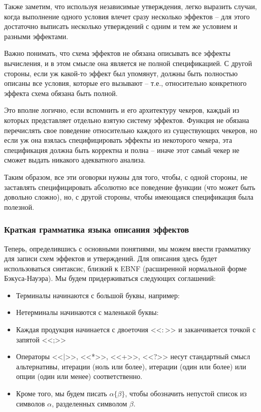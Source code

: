 Также заметим, что используя независимые утверждения, легко выразить случаи, когда выполнение одного условия влечет сразу несколько эффектов -- для этого достаточно выписать несколько утверждений с одним и тем же условием и разными эффектами.

Важно понимать, что схема эффектов не обязана описывать все эффекты вычисления, и в этом смысле она является не полной спецификацией. С другой стороны, если уж какой-то эффект был упомянут, должны быть полностью описаны все условия, которые его вызывают -- т.е., относительно конкретного эффекта схема обязана быть полной.

Это вполне логично, если вспомнить  и его архитектуру чекеров, каждый из которых представляет отдельно взятую систему эффектов. Функция не обязана перечислять свое поведение относительно каждого из существующих чекеров, но если уж она взялась специфицировать эффекты из некоторого чекера, эта спецификация должна быть корректна и полна -- иначе этот самый чекер не сможет выдать никакого адекватного анализа.

Таким образом, все эти оговорки нужны для того, чтобы, с одной стороны, не заставлять специфицировать абсолютно все поведение функции (что может быть довольно сложно), но, с другой стороны, чтобы имеющаяся спецификация была полезной.




\subsubsection{Краткая грамматика языка описания эффектов}

Теперь, определившись с основными понятиями, мы можем ввести грамматику для записи схем эффектов и утверждений. 
Для описания здесь будет использоваться синтаксис, близкий к EBNF (расширенной нормальной форме Бэкуса-Науэра). Мы будем придерживаться следующих соглашений:

\begin{itemize}
    \item Терминалы начинаются с большой буквы, например: 
    
    \item Нетерминалы начинаются с маленькой буквы: 
    
    \item Каждая продукция начинается с двоеточия <<$\colon$>> и заканчивается точкой с запятой <<;>>
    
    \item Операторы <<|>>, <<*>>, <<+>>, <<?>> несут стандартный смысл альтернативы, итерации (ноль или более), итерации (один или более) или опции (один или менее) соответственно.
    
    \item Кроме того, мы будем писать $\alpha \{ \beta \}$, чтобы обозначить непустой список из символов $\alpha$, разделенных символом $\beta$. 
\end{itemize}

